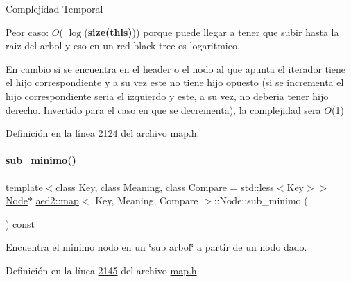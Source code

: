 \begin{DoxyDescription}
\item[Complejidad Temporal]
\begin{DoxyItemize}
\item Peor caso\+: $O$( $\log$({\bfseries size(this)})) porque puede llegar a tener que subir hasta la raiz del arbol y eso en un red black tree es logaritmico.
\item En cambio si se encuentra en el header o el nodo al que apunta el iterador tiene el hijo correspondiente y a su vez este no tiene hijo opuesto (si se incrementa el hijo correspondiente seria el izquierdo y este, a su vez, no deberia tener hijo derecho. Invertido para el caso en que se decrementa), la complejidad sera $O$(1)
\end{DoxyItemize}
\end{DoxyDescription}

Definición en la línea \hyperlink{map_8h_source_l02124}{2124} del archivo \hyperlink{map_8h_source}{map.\+h}.

\mbox{\label{structaed2_1_1map_1_1Node_a0457bc1ad6576f02057d9e9996cc3e5d_a0457bc1ad6576f02057d9e9996cc3e5d}} 
\paragraph{\texorpdfstring{sub\+\_\+minimo()}{sub\_minimo()}}
{\footnotesize\ttfamily template$<$class Key, class Meaning, class Compare = std\+::less$<$\+Key$>$$>$ \\
\hyperlink{structaed2_1_1map_1_1Node}{Node}$\ast$ \hyperlink{classaed2_1_1map}{aed2\+::map}$<$ Key, Meaning, Compare $>$\+::Node\+::sub\+\_\+minimo (\begin{DoxyParamCaption}{ }\end{DoxyParamCaption}) const\hspace{0.3cm}{\ttfamily [inline]}}

Encuentra el minimo nodo en un \char`\"{}sub arbol\char`\"{} a partir de un nodo dado. 

Definición en la línea \hyperlink{map_8h_source_l02145}{2145} del archivo \hyperlink{map_8h_source}{map.\+h}.

\mbox{\label{structaed2_1_1map_1_1Node_a26f1400bc53e5ac9a5b3ad6250a4f832_a26f1400bc53e5ac9a5b3ad6250a4f832}} 
